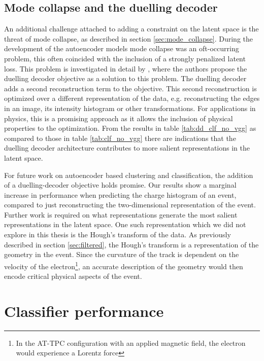 \subsection{Mode collapse and the duelling decoder}

An additional challenge attached to adding a constraint on the latent space is the threat of mode collapse, as described in section \ref{sec:mode_collapse}. During the development of the autoencoder models mode collapse was an oft-occurring problem, this often coincided with the inclusion of a strongly penalized latent loss. This problem is investigated in detail by \citet{Seybold2019}, where the authors propose the duelling decoder objective as a solution to this problem. The duelling decoder adds a second reconstruction term to the objective. This second reconstruction is optimized over a different representation of the data, e.g. reconstructing the edges in an image, its intensity histogram or other transformations. For applications in physics, this is a promising approach as it allows the inclusion of physical properties to the optimization. From the results in table \ref{tab:dd_clf_no_vgg} as compared to those in table \ref{tab:clf_no_vgg} there are indications that the duelling decoder architecture contributes to more salient representations in the latent space. 

For future work on autoencoder based clustering and classification, the addition of a duelling-decoder objective holds promise. Our results show a marginal increase in performance when predicting the charge histogram of an event, compared to just reconstructing the two-dimensional representation of the event. Further work is required on what representations generate the most salient representations in the latent space. One such representation which we did not explore in this thesis is the Hough's transform of the data. As previously described in section \ref{sec:filtered}, the Hough's transform is a representation of the geometry in the event. Since the curvature of the track is dependent on the velocity of the electron\footnote{In the AT-TPC configuration with an applied magnetic field, the electron would experience a Lorentz force}, an accurate description of the geometry would then encode critical physical aspects of the event.


\section{Classifier performance}

